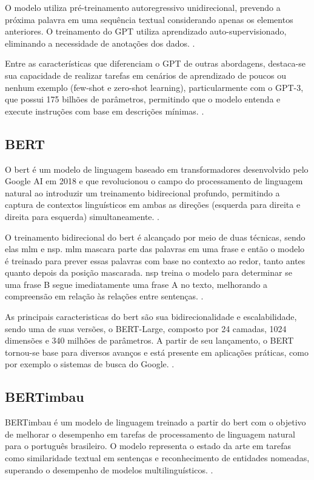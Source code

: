 O modelo utiliza pré-treinamento autoregressivo unidirecional, prevendo a próxima palavra em uma sequência textual considerando apenas os elementos anteriores. O treinamento do GPT utiliza aprendizado auto-supervisionado, eliminando a necessidade de anotações dos dados. \cite{Brown2020}.

Entre as características que diferenciam o GPT de outras abordagens, destaca-se sua capacidade de realizar tarefas em cenários de aprendizado de poucos ou nenhum exemplo (few-shot e zero-shot learning), particularmente com o GPT-3, que possui 175 bilhões de parâmetros, permitindo que o modelo entenda e execute instruções com base em descrições mínimas. \cite{Brown2020}.

\subsection{BERT}\label{subsec:bert}

O \gls{bert} é um modelo de linguagem baseado em transformadores desenvolvido pelo Google AI em 2018 e que revolucionou o campo do processamento de linguagem natural ao introduzir um treinamento bidirecional profundo, permitindo a captura de contextos linguísticos em ambas as direções (esquerda para direita e direita para esquerda) simultaneamente. \cite{Devlin2018}.

O treinamento bidirecional do \gls{bert} é alcançado por meio de duas técnicas, sendo elas \gls{mlm} e \gls{nsp}. \gls{mlm} mascara parte das palavras em uma frase e então o modelo é treinado para prever essas palavras com base no contexto ao redor, tanto antes quanto depois da posição mascarada. \gls{nsp} treina o modelo para determinar se uma frase B segue imediatamente uma frase A no texto, melhorando a compreensão em relação às relações entre sentenças. \cite{Devlin2018}.

As principais caracteristicas do \gls{bert} são sua bidirecionalidade e escalabilidade, sendo uma de suas versões, o BERT-Large, composto por 24 camadas, 1024 dimensões e 340 milhões de parâmetros. A partir de seu lançamento, o BERT tornou-se base para diversos avanços e está presente em aplicações práticas, como por exemplo o sistemas de busca do Google. \cite{Devlin2018}.

\subsection{BERTimbau}\label{subsec:bertimbau}

BERTimbau é um modelo de linguagem treinado a partir do \gls{bert} com o objetivo de melhorar o desempenho em tarefas de processamento de linguagem natural para o português brasileiro. O modelo representa o estado da arte em tarefas como similaridade textual em sentenças e reconhecimento de entidades nomeadas, superando o desempenho de modelos multilinguísticos. \cite{souza2020bertimbau}.


